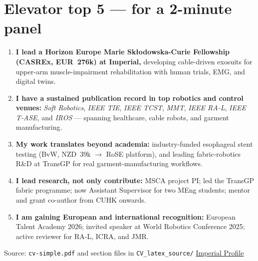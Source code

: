 \documentclass[11pt,a4paper]{article}
\newcommand{\rank}[1]{\textcolor{rankgold}{\textbf{#1}}}
\begin{document}
\vspace{0.6em}
\section*{Elevator top 5 --- for a 2-minute panel}

\begin{enumerate}[leftmargin=1.6em, itemsep=0.65em, label=\rank{\arabic*.}]

  \item \textbf{I lead a Horizon Europe Marie Sk\l{}odowska-Curie Fellowship (CASREx, EUR~276k) at Imperial,}
  developing cable-driven exosuits for upper-arm muscle-impairment rehabilitation with human trials, EMG, and digital twins.

  \item \textbf{I have a sustained publication record in top robotics and control venues:}
  \textit{Soft Robotics}, \textit{IEEE TIE}, \textit{IEEE TCST}, \textit{MMT}, \textit{IEEE RA-L}, \textit{IEEE T-ASE}, and \textit{IROS} --- spanning healthcare, cable robots, and garment manufacturing.

  \item \textbf{My work translates beyond academia:}
  industry-funded esophageal stent testing (BvW, NZD~39k $\to$ RoSE platform), and leading fabric-robotics R\&D at TransGP for real garment-manufacturing workflows.

  \item \textbf{I lead research, not only contribute:}
  MSCA project PI; led the TransGP fabric programme; now Assistant Supervisor for two MEng students; mentor and grant co-author from CUHK onwards.

  \item \textbf{I am gaining European and international recognition:}
  European Talent Academy 2026; invited speaker at World Robotics Conference 2025; active reviewer for RA-L, ICRA, and JMR.

\end{enumerate}

\vspace{0.5em}
\begin{center}
  \small\color{charcoal}
  Source: \texttt{cv-simple.pdf} and section files in \texttt{CV\_latex\_source/} \textbar{}
  \href{https://profiles.imperial.ac.uk/d.bhattacharya1/about}{Imperial Profile}
\end{center}
\end{document}
